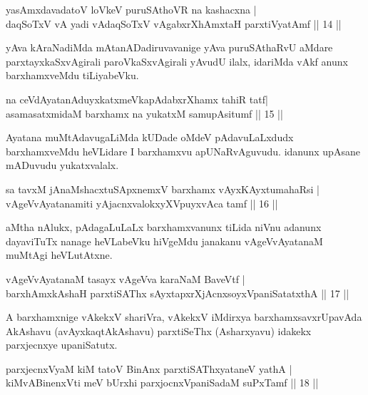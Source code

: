 \begin{shl}
yasAmxdavadatoV loVkeV puruSAthoVR na kashacxna |\\
daqSoTxV vA yadi vA\s daqSoTxV vAgabxrXhAmxtaH parxtiVyatAmf \hfill || 14 || 
\end{shl}

\begin{artha}
yAva kAraNadiMda mAtanADadiruvavanige yAva puruSAthaRvU aMdare parxtayxkaSxvAgirali paroVkaSxvAgirali yAvudU ilalx, idariMda vAkf anunx barxhamxveMdu tiLiyabeVku.
\end{artha}

\begin{shl}
na ceVdAyatanAduyxkatxmeVkapAdabxrXhamx tahiR tatf|\\
asamasatxmidaM barxhamx na yukatxM samupAsitumf \hfill || 15 ||
\end{shl}

\begin{artha}
Ayatana muMtAdavugaLiMda kUDade oMdeV pAdavuLaLxdudx barxhamxveMdu heVLidare I barxhamxvu apUNaRvAguvudu. idanunx upAsane mADuvudu yukatxvalalx.
\end{artha}

\begin{shl}
sa tavxM jAnaMshacxtuSApxnemxV barxhamx vAyxKAyxtumahaRsi |\\
vAgeVvA\s \s yatanamiti yAjacnxvalokxyXV\s puyxvAca tamf \hfill || 16 || 
\end{shl}

\begin{artha}
aMtha nAlukx, pAdagaLuLaLx barxhamxvanunx tiLida niVnu adanunx dayaviTuTx nanage heVLabeVku \mdash hiVgeMdu janakanu vAgeVvAyatanaM muMtAgi heVLutAtxne.
\end{artha}

\begin{shl}
vAgeVvA\s \s yatanaM tasayx vAgeVva karaNaM BaveVtf |\\
barxhAmx\s \s kAshaH parxtiSAThx sAyxtapxrXjAcnx\s soyxVpaniSatatxthA \hfill || 17 || 
\end{shl}

\begin{artha}
A barxhamxnige vAkekxV shariVra, vAkekxV iMdirxya barxhamxsavxrUpavAda AkAshavu (avAyxkaqtAkAshavu) parxtiSeThx (Asharxyavu) idakekx parxjecnxye upaniSatutx.
\end{artha}


\begin{shl}
parxjecnxVyaM kiM tatoV BinAnx parxtiSAThxyataneV yathA |\\
kiMvA\s BinenxVti meV bUrxhi parxjocnxVpaniSadaM suPxTamf \hfill || 18 || 
\end{shl}

